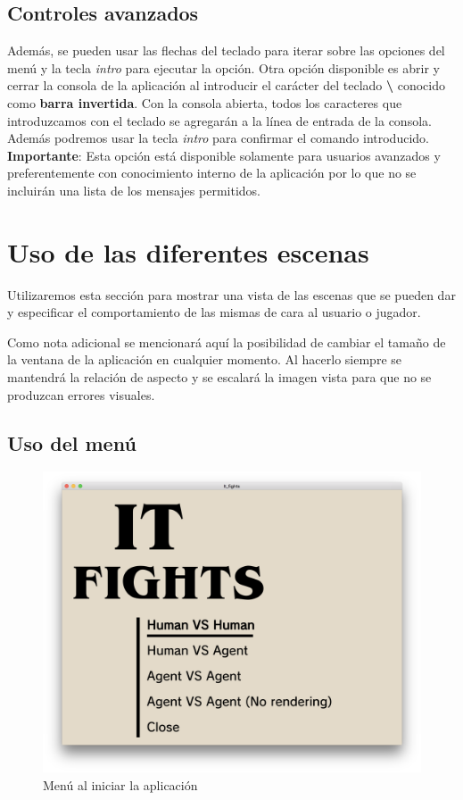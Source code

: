 \subsection{Controles avanzados}

Además, se pueden usar las flechas del teclado para iterar sobre las opciones del menú y la tecla \textit{intro} para ejecutar la opción. Otra opción disponible es abrir y cerrar la consola de la aplicación al introducir el carácter del teclado \textbf{\textbackslash} conocido como \textbf{barra invertida}. Con la consola abierta, todos los caracteres que introduzcamos con el teclado se agregarán a la línea de entrada de la consola. Además podremos usar la tecla \textit{intro} para confirmar el comando introducido. \textbf{Importante}: Esta opción está disponible solamente para usuarios avanzados y preferentemente con conocimiento interno de la aplicación por lo que no se incluirán una lista de los mensajes permitidos.

\section{Uso de las diferentes escenas}

Utilizaremos esta sección para mostrar una vista de las escenas que se pueden dar y especificar el comportamiento de las mismas de cara al usuario o jugador.

\bigskip

Como nota adicional se mencionará aquí la posibilidad de cambiar el tamaño de la ventana de la aplicación en cualquier momento. Al hacerlo siempre se mantendrá la relación de aspecto y se escalará la imagen vista para que no se produzcan errores visuales.

\subsection{Uso del menú}

\begin{figure}[h]
	\centerline{\includegraphics[width=17cm]{otros/manual/menu1.png}}
	\caption{Menú al iniciar la aplicación}
	\label{uso:menu}
\end{figure}

